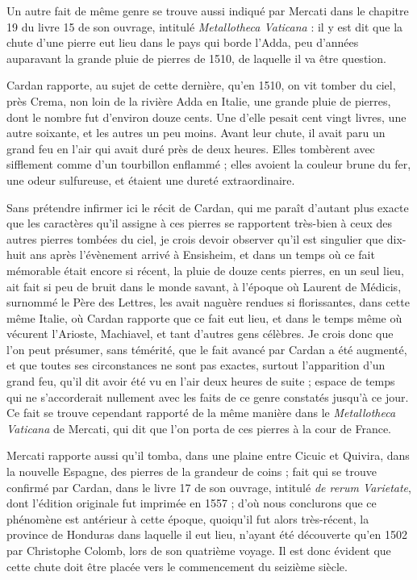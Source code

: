 \documentclass[a4paper, 12pt, oneside, french]{article}
\begin{document}
Un autre fait de même genre se trouve aussi indiqué par Mercati dans le chapitre 19 du livre 15 de son ouvrage, intitulé \emph{Metallotheca Vaticana} : il y est dit que la chute d'une pierre eut lieu dans le pays qui borde l'Adda, peu d'années auparavant la grande pluie de pierres de 1510, de laquelle il va être question.

Cardan rapporte, au sujet de cette dernière, qu'en 1510, on vit tomber du ciel, près Crema, non loin de la rivière Adda en Italie, une grande pluie de pierres, dont le nombre fut d'environ douze cents. Une d'elle pesait cent vingt livres, une autre soixante, et les autres un peu moins. Avant leur chute, il avait paru un grand feu en l'air qui avait duré près de deux heures. Elles tombèrent avec sifflement comme d'un tourbillon enflammé ; elles avoient la couleur brune du fer, une odeur sulfureuse, et étaient une dureté extraordinaire.

Sans prétendre infirmer ici le récit de Cardan, qui me paraît d'autant plus exacte que les caractères qu'il assigne à ces pierres se rapportent très-bien à ceux des autres pierres tombées du ciel, je crois devoir observer qu'il est singulier que dix-huit ans après l'évènement arrivé à Ensisheim, et dans un temps où ce fait mémorable était encore si récent, la pluie de douze cents pierres, en un seul lieu, ait fait si peu de bruit dans le monde savant, à l'époque où Laurent de Médicis, surnommé le Père des Lettres, les avait naguère rendues si florissantes, dans cette même Italie, où Cardan rapporte que ce fait eut lieu, et dans le temps même où vécurent l'Arioste, Machiavel, et tant d'autres gens célèbres. Je crois donc que l'on peut présumer, sans témérité, que le fait avancé par Cardan a été augmenté, et que toutes ses circonstances ne sont pas exactes, surtout l'apparition d'un grand feu, qu'il dit avoir été vu en l'air deux heures de suite ; espace de temps qui ne s'accorderait nullement avec les faits de ce genre constatés jusqu'à ce jour. Ce fait se trouve cependant rapporté de la même manière dans le \emph{Metallotheca Vaticana} de Mercati, qui dit que l'on porta de ces pierres à la cour de France.

Mercati rapporte aussi qu'il tomba, dans une plaine entre Cicuic et Quivira, dans la nouvelle Espagne, des pierres de la grandeur de coins ; fait qui se trouve confirmé par Cardan, dans le livre 17 de son ouvrage, intitulé \emph{de rerum Varietate}, dont l'édition originale fut imprimée en 1557 ; d'où nous conclurons que ce phénomène est antérieur à cette époque, quoiqu'il fut alors très-récent, la province de Honduras dans laquelle il eut lieu, n'ayant été découverte qu'en 1502 par Christophe Colomb, lors de son quatrième voyage. Il est donc évident que cette chute doit être placée vers le commencement du seizième siècle.
\end{document}
